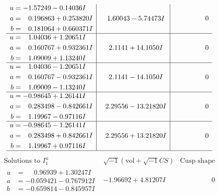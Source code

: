 \documentclass[1p]{elsarticle_modified}
\theoremstyle{definition}
\newcommand{\I}{\sqrt{-1}}
\begin{document}
$$\begin{array}{c|c|c}
\begin{aligned}
u &= -1.57249 - 0.14036 I \\
a &= \phantom{-}0.196863 + 0.253820 I \\
b &= \phantom{-}0.181064 + 0.660371 I\end{aligned}
 & \phantom{-}1.60043 - 5.74473 I & \phantom{-0.000000 } 0 \\ \hline\begin{aligned}
u &= \phantom{-}1.04036 + 1.20651 I \\
a &= \phantom{-}0.160767 + 0.932361 I \\
b &= \phantom{-}1.09009 + 1.13240 I\end{aligned}
 & \phantom{-}2.1141 + 14.1050 I & \phantom{-0.000000 } 0 \\ \hline\begin{aligned}
u &= \phantom{-}1.04036 - 1.20651 I \\
a &= \phantom{-}0.160767 - 0.932361 I \\
b &= \phantom{-}1.09009 - 1.13240 I\end{aligned}
 & \phantom{-}2.1141 - 14.1050 I & \phantom{-0.000000 } 0 \\ \hline\begin{aligned}
u &= -0.98645 + 1.26141 I \\
a &= \phantom{-}0.283498 - 0.842661 I \\
b &= \phantom{-}1.19967 - 0.97116 I\end{aligned}
 & \phantom{-}2.29556 - 13.21820 I & \phantom{-0.000000 } 0 \\ \hline\begin{aligned}
u &= -0.98645 - 1.26141 I \\
a &= \phantom{-}0.283498 + 0.842661 I \\
b &= \phantom{-}1.19967 + 0.97116 I\end{aligned}
 & \phantom{-}2.29556 + 13.21820 I & \phantom{-0.000000 } 0\\
 \hline 
 \end{array}$$\newpage$$\begin{array}{c|c|c}  
\text{Solutions to }I^u_{1}& \I (\text{vol} + \sqrt{-1}CS) & \text{Cusp shape}\\
 \hline 
\begin{aligned}
u &= \phantom{-}0.96939 + 1.30247 I \\
a &= -0.059421 - 0.767912 I \\
b &= -0.659814 - 0.845957 I\end{aligned}
 & -1.96692 + 4.81207 I & \phantom{-0.000000 } 0 \\ \hline\begin{aligned}

\end{aligned}
\end{array}$$
\end{document}

